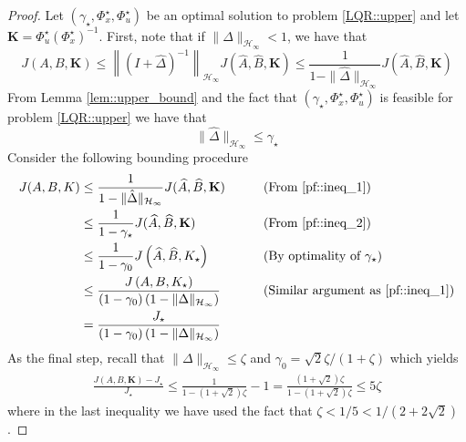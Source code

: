 \documentclass{article}[12pt]
\begin{document}
\begin{proof}
Let $\left(\gamma_{\star}, \Phi_{x}^{\star}, \Phi_{u}^{\star}\right)$ be an optimal solution to problem \eqref{LQR::upper} and let $\mathbf{K}=\Phi_{u}^{\star}\left(\Phi_{x}^{\star}\right)^{-1}$. First, note that if $\|\hat{\Delta}\|_{\mathcal{H}_{\infty}}<1$, we have that
\begin{equation}
\label{pf::ineq_1}
    J(A, B, \mathbf{K}) \leq\left\|(I+\hat{\Delta})^{-1}\right\|_{\mathcal{H}_{\infty}} J(\widehat{A}, \widehat{B}, \mathbf{K}) \leq \frac{1}{1-\|\hat{\Delta}\|_{\mathcal{H}_{\infty}}} J(\widehat{A}, \widehat{B}, \mathbf{K})
\end{equation}
From Lemma \ref{lem::upper_bound} and the fact that $\left(\gamma_{\star}, \Phi_{x}^{\star}, \Phi_{u}^{\star}\right)$ is feasible for problem \eqref{LQR::upper} we have that
\begin{equation}
\label{pf::ineq_2}
    \|\hat{\Delta}\|_{\mathcal{H}_{\infty}} \leq \gamma_{\star}
\end{equation}
Consider the following bounding procedure
\begin{equation}
\label{pf::ineq_3}
\begin{aligned}
    J(A, B, K) & \leq \frac{1}{1-\|\hat{\Delta}\|_{\mathcal{H}_{\infty}}} J(\widehat{A}, \widehat{B}, \mathbf{K}) \qquad &&\text{(From \eqref{pf::ineq_1})}  \\
    &\leq \frac{1}{1-\gamma_{\star}} J(\widehat{A}, \widehat{B}, \mathbf{K}) \qquad &&\text{(From \eqref{pf::ineq_2})} \\
    &\leq \frac{1}{1-\gamma_{0}} J\left(\widehat{A}, \widehat{B}, K_{\star}\right) \qquad &&\text{(By optimality of $\gamma_{\star}$)} \\
    &\leq \frac{J\left(A, B, K_{\star}\right)}{\left(1-\gamma_{0}\right)\left(1-\|\Delta\|_{ \mathcal{H}_{\infty}}\right)} \qquad &&\text{(Similar argument as \eqref{pf::ineq_1})} \\
    &= \frac{J_{\star}}{\left(1-\gamma_{0}\right)\left(1-\|\Delta\|_{ \mathcal{H}_{\infty}}\right)} 
\end{aligned}
\end{equation}
As the final step, recall that $\|\Delta\|_{\mathcal{H}_{\infty}} \leq \zeta$ and $\gamma_{0}=\sqrt{2} \zeta /(1+\zeta)$ which yields
\begin{equation}
\begin{aligned}
    \frac{J(A, B, \mathbf{K})-J_{\star}}{J_{\star}} \leq \frac{1}{1-(1+\sqrt{2}) \zeta}-1=\frac{(1+\sqrt{2}) \zeta}{1-(1+\sqrt{2}) \zeta} \leq 5 \zeta
\end{aligned}
\end{equation}
where in the last inequality we have used the fact that $\zeta<1 / 5<1 /(2+2 \sqrt{2})$.
\end{proof}
\end{document}
